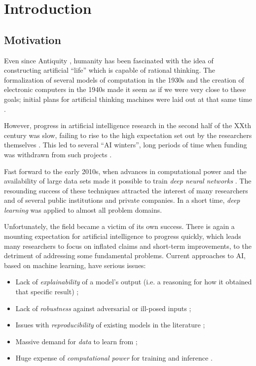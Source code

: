 \chapter{Introduction}

\section{Motivation}

Even since Antiquity \cite{Mayor2018}, humanity has been fascinated with the idea of constructing artificial ``life'' which is capable of rational thinking. The formalization of several models of computation in the 1930s and the creation of electronic computers in the 1940s made it seem as if we were very close to these goals; initial plans for artificial thinking machines were laid out at that same time \cite{Turing1950_ComputingMachineryAndIntelligence}.

However, progress in artificial intelligence research in the second half of the XXth century was slow, failing to rise to the high expectation set out by the researchers themselves \cite{Newquist1994}. This led to several ``AI winters'', long periods of time when funding was withdrawn from such projects \cite[p.~203]{Crevier1993}.

Fast forward to the early 2010s, when advances in computational power and the availability of large data sets made it possible to train \emph{deep neural networks} \cite{LeCun2015, Schmidhuber2015}. The resounding success of these techniques attracted the interest of many researchers and of several public institutions and private companies. In a short time, \emph{deep learning} was applied to almost all problem domains.

Unfortunately, the field became a victim of its own success. There is again a mounting expectation for artificial intelligence to progress quickly, which leads many researchers to focus on inflated claims and short-term improvements, to the detriment of addressing some fundamental problems. Current approaches to AI, based on machine learning, have serious issues:
\begin{itemize}
    \item Lack of \emph{explainability} of a model's output (i.e. a reasoning for how it obtained that specific result) \cite{Castelvecchi2016, Sample2017};
    \item Lack of \emph{robustness} against adversarial or ill-posed inputs \cite{SivaKumar2020};
    \item Issues with \emph{reproducibility} of existing models in the literature \cite{Hutson2018_ReproducibilityCrisis, Kapoor2023};
    \item Massive demand for \emph{data} to learn from \cite{Paullada2021};
    \item Huge expense of \emph{computational power} for training and inference \cite{Thompson2020}.
\end{itemize}

